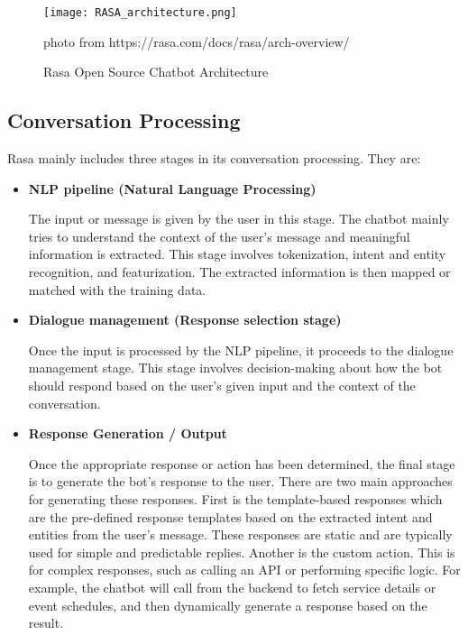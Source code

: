 \begin{figure}[h]
	\centering 
	\texttt{[image: RASA\_architecture.png]}
	\caption{Rasa Open Source Chatbot Architecture}
	photo from https://rasa.com/docs/rasa/arch-overview/
	\label{fig:rasa_architecture}
\end{figure}

\subsection {Conversation Processing}

Rasa mainly includes three stages in its conversation processing. They are:

\begin{itemize}
	\item \textbf{NLP pipeline (Natural Language Processing)}
	
	The input or message is given by the user in this stage. The chatbot mainly tries to understand the context of the user’s message and meaningful information is extracted. This stage involves tokenization, intent and entity recognition, and featurization. The extracted information is then mapped or matched with the training data.
	
	\item \textbf{Dialogue management (Response selection stage)}
	
	Once the input is processed by the NLP pipeline, it proceeds to the dialogue management stage. This stage involves decision-making about how the bot should respond based on the user’s given input and the context of the conversation. 
	
	\item \textbf{Response Generation / Output}
	
	Once the appropriate response or action has been determined, the final stage is to generate the bot’s response to the user.  There are two main approaches for generating these responses. First is the template-based responses which are the pre-defined response templates based on the extracted intent and entities from the user’s message. These responses are static and are typically used for simple and predictable replies. Another is the custom action. This is for complex responses, such as calling an API or performing specific logic. For example, the chatbot will call from the backend to fetch service details or event schedules, and then dynamically generate a response based on the result.
	
\end{itemize}

